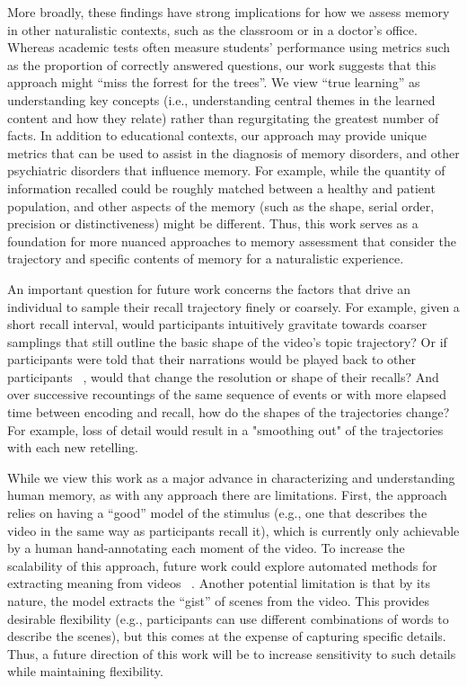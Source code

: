 \documentclass{article}
\begin{document}
More broadly, these findings have strong implications for how we assess memory in other naturalistic contexts, such as the classroom or in a doctor's office.  Whereas academic tests often measure students' performance using metrics such as the proportion of correctly answered questions, our work suggests that this approach might ``miss the forrest for the trees''. We view ``true learning'' as understanding key concepts (i.e., understanding central themes in the learned content and how they relate) rather than regurgitating the greatest number of facts. In addition to educational contexts, our approach may provide unique metrics that can be used to assist in the diagnosis of memory disorders, and other psychiatric disorders that influence memory. For example, while the quantity of information recalled could be roughly matched between a healthy and patient population, and other aspects of the memory (such as the shape, serial order, precision or distinctiveness) might be different. Thus, this work serves as a foundation for more nuanced approaches to memory assessment that consider the trajectory and specific contents of memory for a naturalistic experience.

An important question for future work concerns the factors that drive an individual to sample their recall trajectory finely or coarsely. For example, given a short recall interval, would participants intuitively gravitate towards coarser samplings that still outline the basic shape of the video's topic trajectory? Or if participants were told that their narrations would be played back to other participants ~\citep{ZadbEtal17}, would that change the resolution or shape of their recalls? And over successive recountings of the same sequence of events or with more elapsed time between encoding and recall, how do the shapes of the trajectories change? For example, loss of detail would result in a "smoothing out" of the trajectories with each new retelling.

While we view this work as a major advance in characterizing and understanding human memory, as with any approach there are limitations. First, the approach relies on having a ``good'' model of the stimulus (e.g., one that describes the video in the same way as participants recall it), which is currently only achievable by a human hand-annotating each moment of the video.  To increase the scalability of this approach, future work could explore automated methods for extracting meaning from videos ~\citep{YuEtal16}.  Another potential limitation is that by its nature, the model extracts the ``gist'' of scenes from the video.  This provides desirable flexibility (e.g., participants can use different combinations of words to describe the scenes), but this comes at the expense of capturing specific details.  Thus, a future direction of this work will be to increase sensitivity to such details while maintaining flexibility.
\end{document}

